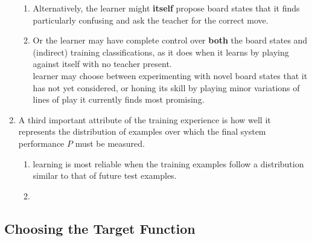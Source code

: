 \begin{enumerate}[itemsep=0.2cm]
\begin{enumerate}
        \item Alternatively, the learner might \textbf{itself} propose board states that it finds particularly confusing and ask the teacher for the correct move.
        \hfill \cite{ml/book/Machine-Learning/Tom-M-Mitchell}

        \item Or the learner may have complete control over \textbf{both} the board states and (indirect) training classifications, as it does when it learns by playing against itself with no teacher present.
        \hfill \cite{ml/book/Machine-Learning/Tom-M-Mitchell}
        \\
        learner may choose between experimenting with novel board states that it has not yet considered, or honing its skill by playing minor variations of lines of play it currently finds most promising.
        \hfill \cite{ml/book/Machine-Learning/Tom-M-Mitchell}
    \end{enumerate}

    \item A third important attribute of the training experience is how well it represents the distribution of examples over which the final system performance $P$ must be measured.
    \hfill \cite{ml/book/Machine-Learning/Tom-M-Mitchell}
    \begin{enumerate}
        \item learning is most reliable when the training examples follow a distribution similar to that of future test examples.
        \hfill \cite{ml/book/Machine-Learning/Tom-M-Mitchell}

        \item 
        \hfill \cite{ml/book/Machine-Learning/Tom-M-Mitchell}
    \end{enumerate}
\end{enumerate}




\subsection{Choosing the Target Function}


